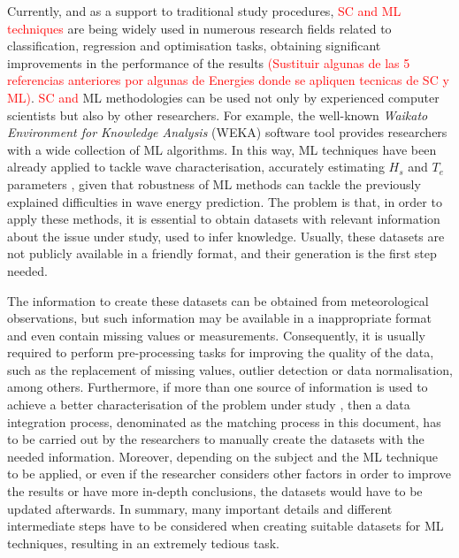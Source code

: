 \documentclass[energies,article,submit,moreauthors,pdftex]{Definitions/mdpi}
\begin{document}
		Currently, and as a support to traditional study procedures, \textcolor{red}{SC and ML techniques} \cite{Alpaydin:2004:IML:1036287,Bishop:2006:PRM:1162264} are being widely used in numerous research fields related to classification, regression and optimisation tasks, obtaining significant improvements in the performance of the results \cite{DELFANI2019100559,NASRUDDIN201948,GUO201816} \textcolor{red}{(Sustituir algunas de las 5 referencias anteriores por algunas de Energies donde se apliquen tecnicas de SC y ML)}. \textcolor{red}{SC and} ML methodologies can be used not only by experienced computer scientists but also by other researchers. For example, the well-known \textit{Waikato Environment for Knowledge Analysis} (WEKA) \cite{WEKA} software tool provides researchers with a wide collection of ML algorithms. In this way, ML techniques have been already applied to tackle wave characterisation, accurately estimating $H_{s}$ and $T_{e}$ parameters \cite{DURANROSAL2017268, KUMAR2017605}, given that robustness of ML methods can tackle the previously explained difficulties in wave energy prediction. The problem is that, in order to apply these methods, it is essential to obtain datasets with relevant information about the issue under study, used to infer knowledge. Usually, these datasets are not publicly available in a friendly format, and their generation is the first step needed.

		The information to create these datasets can be obtained from meteorological observations, but such information may be available in a inappropriate format and even contain missing values or measurements. Consequently, it is usually required to perform pre-processing tasks for improving the quality of the data, such as the replacement of missing values, outlier detection or data normalisation, among others. Furthermore, if more than one source of information is used to achieve a better characterisation of the problem under study \cite{JOHANSSON2015143, FERNANDEZ201544, Adams2010}, then a data integration process, denominated as the matching process in this document, has to be carried out by the researchers to manually create the datasets with the needed information. Moreover, depending on the subject and the ML technique to be applied, or even if the researcher considers other factors in order to improve the results or have more in-depth conclusions, the datasets would have to be updated afterwards. In summary, many important details and different intermediate steps have to be considered when creating suitable datasets for ML techniques, resulting in an extremely tedious task.
\end{document}
